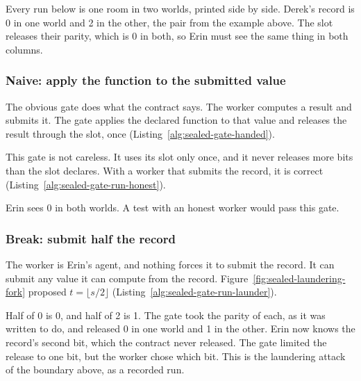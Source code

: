 
Every run below is one room in two worlds, printed side by side. Derek's
record is 0 in one world and 2 in the other, the pair from the example
above. The slot releases their parity, which is 0 in both, so Erin must
see the same thing in both columns.

\subsubsection{Naive: apply the function to the submitted value}

The obvious gate does what the contract says. The worker computes a result
and submits it. The gate applies the declared function to that value and
releases the result through the slot, once
(Listing~\ref{alg:sealed-gate-handed}).


This gate is not careless. It uses its slot only once, and it never
releases more bits than the slot declares. With a worker that submits the
record, it is correct (Listing~\ref{alg:sealed-gate-run-honest}).


Erin sees 0 in both worlds. A test with an honest worker would pass this
gate.

\subsubsection{Break: submit half the record}

The worker is Erin's agent, and nothing forces it to submit the record. It
can submit any value it can compute from the record.
Figure~\ref{fig:sealed-laundering-fork} proposed $t=\lfloor s/2\rfloor$
(Listing~\ref{alg:sealed-gate-run-launder}).


Half of 0 is 0, and half of 2 is 1. The gate took the parity of each, as it
was written to do, and released 0 in one world and 1 in the other. Erin now
knows the record's second bit, which the contract never released. The gate
limited the release to one bit, but the worker chose which bit. This is
the laundering attack of the boundary above, as a recorded run.

